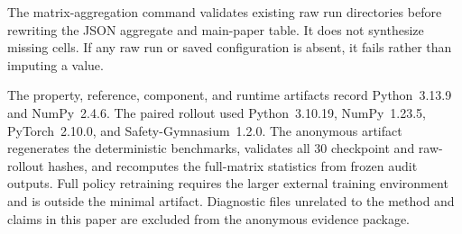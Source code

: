 \documentclass[letterpaper]{article}
\begin{document}
The matrix-aggregation command validates existing raw run directories before
rewriting the JSON aggregate and main-paper table.  It does not synthesize
missing cells.  If any raw run or saved configuration is absent, it fails
rather than imputing a value.

The property, reference, component, and runtime artifacts record
Python~3.13.9 and NumPy~2.4.6.  The paired rollout used Python~3.10.19,
NumPy~1.23.5, PyTorch~2.10.0, and Safety-Gymnasium~1.2.0.  The anonymous
artifact regenerates the deterministic benchmarks, validates all 30
checkpoint and raw-rollout hashes, and recomputes the full-matrix statistics
from frozen audit outputs.  Full policy retraining requires the larger
external training environment and is outside the minimal artifact.
Diagnostic files unrelated to the method and claims in this paper are
excluded from the anonymous evidence package.
\end{document}
